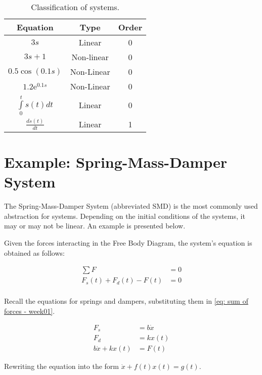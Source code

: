 \begin{table}[t]
\centering
\begin{tabular}{c|cc}
Equation & Type & Order\\
\hline
$3s$ & Linear & 0\\
$3s + 1$ & Non-linear & 0\\
$0.5 \cos (0.1 s)$ & Non-Linear & 0\\
$1.2 \mathrm{e}^{0.1s}$ & Non-Linear & 0\\
$\int\limits_0^{t} s(t)dt$ & Linear & 0\\
$\frac{d s(t)}{dt}$ & Linear & 1\\
\hline
\end{tabular}
\label{table: exercise 1 order}
\caption{Classification of systems.}
\end{table}

\section{Example: Spring-Mass-Damper System}

The Spring-Mass-Damper System (abbreviated SMD) is the most 
commonly used abstraction for systems. Depending on the 
initial conditions of the systems, it may or may not be 
linear. An example is presented below.

Given the forces interacting in the Free Body Diagram, the 
system's equation is obtained as follows:

\begin{equation}
 \begin{split}
  \sum F & = 0\\
  F_s(t) + F_d(t) - F(t) & = 0\\
 \end{split}
 \label{eq: sum of forces - week01}
\end{equation}

Recall the equations for springs and dampers, substituting 
them in \eqref{eq: sum of forces - week01}.

\begin{equation*}
 \begin{split}
  F_s & = b \dot{x}\\
  F_d & = k x(t)\\
  b \dot{x} + k x(t) & = F(t)
 \end{split}
\end{equation*}

Rewriting the equation into the form $\dot x + f(t) x(t) = 
g(t)$.

